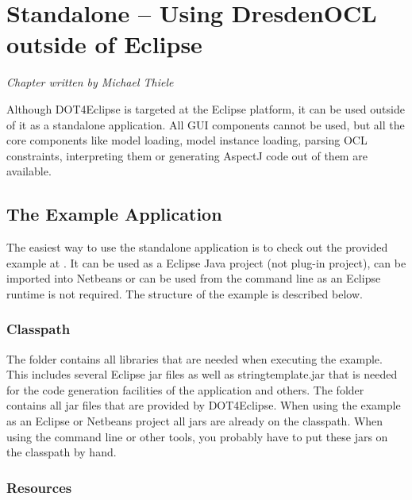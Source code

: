 \chapter{Standalone -- Using DresdenOCL outside of Eclipse}
\label{chapter:standalone}
\lstset{language=Java}

\begin{flushright}
\textit{Chapter written by Michael Thiele}
\end{flushright}

Although \acl{DOT4Eclipse} is targeted at the Eclipse platform, it can be used outside of it as a standalone application. All GUI components cannot be used, but all the core components like model loading, model instance loading, parsing OCL constraints, interpreting them or generating AspectJ code out of them are available.


\section{The Example Application}

The easiest way to use the standalone application is to check out the provided example at . It can be used as a Eclipse Java project (not plug-in project), can be imported into Netbeans or can be used from the command line as an Eclipse runtime is not required. The structure of the example is described below.


\subsection{Classpath}

The  folder contains all libraries that are needed when executing the example. This includes several Eclipse jar files as well as stringtemplate.jar that is needed for the code generation facilities of the application and others. The  folder contains all jar files that are provided by \acl{DOT4Eclipse}. When using the example as an Eclipse or Netbeans project all jars are already on the classpath. When using the command line or other tools, you probably have to put these jars on the classpath by hand.


\subsection{Resources}

